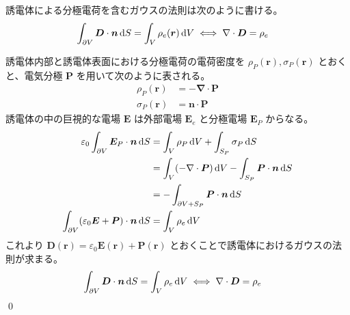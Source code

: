 \documentclass[uplatex,dvipdfmx,a4paper,11pt]{jlreq}
\makeatletter
\newcommand{\EE}{\bm{E}}
\newcommand{\DD}{\bm{D}}
\newcommand{\PP}{\bm{P}}
\newcommand{\rr}{\bm{r}}
\newcommand{\vnabla}{\mathbf{\nabla}}
\numberwithin{equation}{section}
\theoremstyle{definition}
\renewenvironment{proof}[1][\proofname]{\par
  \normalfont
  \topsep6\p@\@plus6\p@ \trivlist
  \item[\hskip\labelsep{\bfseries #1}\@addpunct{\bfseries}]\ignorespaces\quad\par
}{%
  \qed\endtrivlist\@endpefalse
}
\renewcommand\proofname{証明}
\makeatother
\begin{document}
\begin{theorem}[誘電体のガウスの法則]
  誘電体による分極電荷を含むガウスの法則は次のように書ける。
  \begin{align}
    \int_{\partial V}\DD\cdot\bm{n}\dl{S} & = \int_V\rho_e(\rr)\dl{V} \iff \vnabla\cdot\DD = \rho_e
  \end{align}
\end{theorem}
\begin{proof}
  誘電体内部と誘電体表面における分極電荷の電荷密度を $\rho_P(\rr), \sigma_P(\rr)$ とおくと、電気分極 $\bm{P}$ を用いて次のように表される。
  \begin{align}
    \rho_P(\rr)   & = - \vnabla\cdot\PP \\
    \sigma_P(\rr) & = \bm{n}\cdot\PP
  \end{align}
  誘電体の中の巨視的な電場 $\EE$ は外部電場 $\EE_e$ と分極電場 $\EE_P$ からなる。
  \begin{align}
    \varepsilon_0\int_{\partial V}\EE_P\cdot\bm{n}\dl{S}       & = \int_V\rho_P\dl{V} + \int_{S_P}\sigma_P\dl{S}                         \\
                                                               & = \int_V(-\vnabla\cdot\bm{P})\dl{V} - \int_{S_P}\bm{P}\cdot\bm{n}\dl{S} \\
                                                               & = - \int_{\partial V + S_P}\bm{P}\cdot\bm{n}\dl{S}                      \\
    \int_{\partial V}(\varepsilon_0\EE + \PP)\cdot\bm{n}\dl{S} & = \int_{V}\rho_e\dl{V}
  \end{align}
  これより $\DD(\rr) = \varepsilon_0\EE(\rr) + \bm{P}(\rr)$ とおくことで誘電体におけるガウスの法則が求まる。
  \begin{align}
    \int_{\partial V}\DD\cdot\bm{n}\dl{S} & = \int_{V}\rho_e\dl{V} \iff \vnabla\cdot\DD = \rho_e
  \end{align}
\end{proof}
\end{document}
